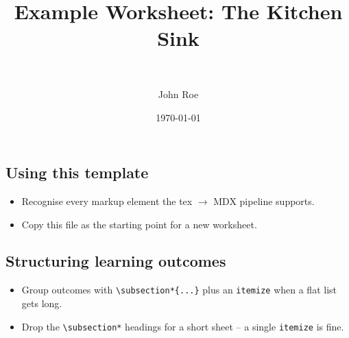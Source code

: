 \documentclass[11pt]{article}
\title{Example Worksheet: The Kitchen Sink}
\author{\authorname{Jane Doe}\\ \affiliation{Example University}
  \and John Roe}
\date{\today}
\begin{document}
\maketitle

\begin{learningoutcomes}
  \subsection*{Using this template}
  \begin{itemize}
    \item Recognise every markup element the tex $\to$ MDX pipeline supports.
    \item Copy this file as the starting point for a new worksheet.
  \end{itemize}

  \subsection*{Structuring learning outcomes}
  \begin{itemize}
    \item Group outcomes with \verb|\subsection*{...}| plus an \verb|itemize| when a flat list gets long.
    \item Drop the \verb|\subsection*| headings for a short sheet -- a single \verb|itemize| is fine.
  \end{itemize}
\end{learningoutcomes}
\end{document}
